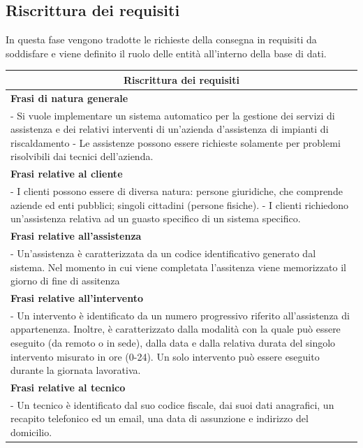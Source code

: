 \documentclass[legalpaper]{article}
\begin{document}
\subsection{Riscrittura dei requisiti}
In questa fase vengono tradotte le richieste della consegna in requisiti da soddisfare e viene definito il ruolo delle entità all’interno della base di dati.
\newline

\begin{tabular}{ |p{16 cm}| }
\hline
\multicolumn{1}{|c|}{\textbf{Riscrittura dei requisiti}} \\
\hline
\textbf{Frasi di natura generale}  \\
\hline
- Si vuole implementare un sistema automatico per la gestione dei servizi di assistenza e dei relativi interventi di un'azienda d'assistenza di impianti di riscaldamento \newline
- Le assistenze possono essere richieste solamente per problemi risolvibili dai tecnici dell'azienda.\\ \hline
\textbf{Frasi relative al cliente}  \\
\hline
-  I clienti possono essere di diversa natura:  \newline persone giuridiche, che comprende aziende ed enti pubblici; \newline  singoli cittadini (persone fisiche). \newline
- I clienti richiedono un'assistenza relativa ad un guasto specifico di un sistema specifico.\\
\hline
\textbf{Frasi relative all'assistenza}  \\
\hline
- Un'assistenza è caratterizzata da un codice identificativo generato dal sistema. Nel momento in cui viene completata l'assitenza viene memorizzato il giorno di fine di assitenza\\
\hline
\textbf{Frasi relative all'intervento}  \\
\hline
- Un intervento è identificato da un numero progressivo riferito all'assistenza di appartenenza. Inoltre, è caratterizzato dalla modalità con la quale può essere eseguito (da remoto o in sede), dalla data e dalla relativa durata del singolo intervento misurato in ore (0-24). Un solo intervento può essere eseguito durante la giornata lavorativa.\\
\hline
\textbf{Frasi relative al tecnico}  \\
\hline
- Un tecnico è identificato dal suo codice fiscale, dai suoi dati anagrafici, un recapito telefonico ed un email, una data di assunzione e indirizzo del domicilio.\\

\end{tabular}
\end{document}
